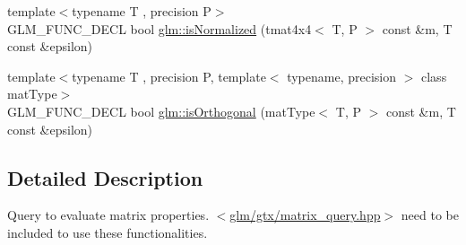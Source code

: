\begin{DoxyCompactItemize}
\item 
{\footnotesize template$<$typename T , precision P$>$ }\\G\-L\-M\-\_\-\-F\-U\-N\-C\-\_\-\-D\-E\-C\-L bool \hyperlink{group__gtx__matrix__query_ga934b673ec0e16d79eca0ca9dbb5d6d8b}{glm\-::is\-Normalized} (tmat4x4$<$ T, P $>$ const \&m, T const \&epsilon)
\item 
{\footnotesize template$<$typename T , precision P, template$<$ typename, precision $>$ class mat\-Type$>$ }\\G\-L\-M\-\_\-\-F\-U\-N\-C\-\_\-\-D\-E\-C\-L bool \hyperlink{group__gtx__matrix__query_gab2cb5d23df77b4e4e63ad2965acd31b3}{glm\-::is\-Orthogonal} (mat\-Type$<$ T, P $>$ const \&m, T const \&epsilon)
\end{DoxyCompactItemize}


\subsection{Detailed Description}
Query to evaluate matrix properties. $<$\hyperlink{matrix__query_8hpp}{glm/gtx/matrix\-\_\-query.\-hpp}$>$ need to be included to use these functionalities. 

